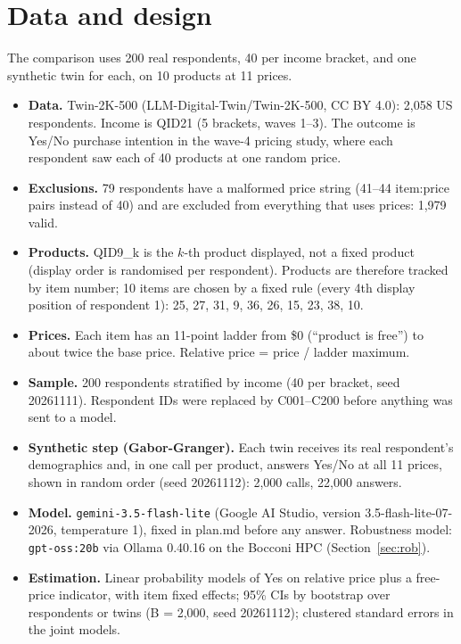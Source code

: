 \documentclass[11pt,a4paper]{article}
\begin{document}
\section{Data and design}

The comparison uses 200 real respondents, 40 per income bracket, and one synthetic twin for each, on 10 products at 11 prices.

\begin{itemize}
\item \textbf{Data.} Twin-2K-500 (LLM-Digital-Twin/Twin-2K-500, CC BY 4.0): 2,058 US respondents. Income is QID21 (5 brackets, waves 1--3). The outcome is Yes/No purchase intention in the wave-4 pricing study, where each respondent saw each of 40 products at one random price.
\item \textbf{Exclusions.} 79 respondents have a malformed price string (41--44 item:price pairs instead of 40) and are excluded from everything that uses prices: 1,979 valid.
\item \textbf{Products.} QID9\_k is the $k$-th product displayed, not a fixed product (display order is randomised per respondent). Products are therefore tracked by item number; 10 items are chosen by a fixed rule (every 4th display position of respondent 1): 25, 27, 31, 9, 36, 26, 15, 23, 38, 10.
\item \textbf{Prices.} Each item has an 11-point ladder from \$0 (``product is free'') to about twice the base price. Relative price = price / ladder maximum.
\item \textbf{Sample.} 200 respondents stratified by income (40 per bracket, seed 20261111). Respondent IDs were replaced by C001--C200 before anything was sent to a model.
\item \textbf{Synthetic step (Gabor-Granger).} Each twin receives its real respondent's demographics and, in one call per product, answers Yes/No at all 11 prices, shown in random order (seed 20261112): 2,000 calls, 22,000 answers.
\item \textbf{Model.} \texttt{gemini-3.5-flash-lite} (Google AI Studio, version 3.5-flash-lite-07-2026, temperature 1), fixed in plan.md before any answer. Robustness model: \texttt{gpt-oss:20b} via Ollama 0.40.16 on the Bocconi HPC (Section~\ref{sec:rob}).
\item \textbf{Estimation.} Linear probability models of Yes on relative price plus a free-price indicator, with item fixed effects; 95\% CIs by bootstrap over respondents or twins (B = 2,000, seed 20261112); clustered standard errors in the joint models.
\end{itemize}
\end{document}
